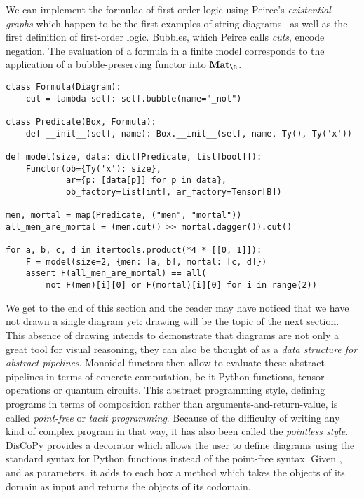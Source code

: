 \begin{example}
We can implement the formulae of first-order logic using Peirce's \emph{existential graphs} which happen to be the first examples of string diagrams~\cite{BradyTrimble98,BradyTrimble00,MelliesZeilberger16,HaydonSobocinski20} as well as the first definition of first-order logic.
Bubbles, which Peirce calls \emph{cuts}, encode negation.
The evaluation of a formula in a finite model corresponds to the application of a bubble-preserving functor into $\mathbf{Mat}_\B$.

\begin{verbatim}
class Formula(Diagram):
    cut = lambda self: self.bubble(name="_not")

class Predicate(Box, Formula):
    def __init__(self, name): Box.__init__(self, name, Ty(), Ty('x'))

def model(size, data: dict[Predicate, list[bool]]):
    Functor(ob={Ty('x'): size},
            ar={p: [data[p]] for p in data},
            ob_factory=list[int], ar_factory=Tensor[B])

men, mortal = map(Predicate, ("men", "mortal"))
all_men_are_mortal = (men.cut() >> mortal.dagger()).cut()

for a, b, c, d in itertools.product(*4 * [[0, 1]]):
    F = model(size=2, {men: [a, b], mortal: [c, d]})
    assert F(all_men_are_mortal) == all(
        not F(men)[i][0] or F(mortal)[i][0] for i in range(2))
\end{verbatim}
\end{example}

We get to the end of this section and the reader may have noticed that we have not drawn a single diagram yet: drawing will be the topic of the next section.
This absence of drawing intends to demonstrate that diagrams are not only a great tool for visual reasoning, they can also be thought of as a \emph{data structure for abstract pipelines}.
Monoidal functors then allow to evaluate these abstract pipelines in terms of concrete computation, be it Python functions, tensor operations or quantum circuits.
This abstract programming style, defining programs in terms of composition rather than arguments-and-return-value, is called \emph{point-free} or \emph{tacit programming}.
Because of the difficulty of writing any kind of complex program in that way, it has also been called the \emph{pointless style}.
DisCoPy provides a  decorator which allows the user to define diagrams using the standard syntax for Python functions instead of the point-free syntax.
Given ,  and  as parameters, it adds to each box a  method which takes the objects of its domain as input and returns the objects of its codomain.


